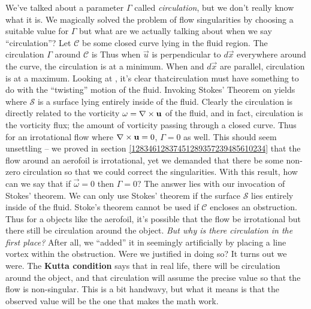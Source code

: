 \documentclass[12pt]{book}
\begin{document}
We've talked about a parameter $\Gamma$ called \textit{circulation}, but we don't really know what it is.  We magically solved the problem of flow singularities by choosing a suitable value for $\Gamma$ but what are we actually talking about when we say ``circulation''?  Let $\mathcal C$ be some closed curve lying in the fluid region.  The circulation $\Gamma$ around $\mathcal C$ is 
Thus when $\vec u$ is perpendicular to $d\vec x$ everywhere around the curve, the circulation is at a minimum.  When \vecu and $d\vec x$ are parallel, circulation is at a maximum.  Looking at , it's clear thatcirculation must have something to do with the ``twisting'' motion of the fluid.  Invoking Stokes' Theorem on  yields
where $\mathcal S$ is a surface lying entirely inside of the fluid.  Clearly the circulation is directly related to the vorticity $\vec\omega = \curl\vec u$ of the fluid, and in fact, circulation is the vorticity flux; the amount of vorticity passing through a closed curve.  Thus for an irrotational flow where $\curl\vec u=0$, $\Gamma=0$ as well.  This should seem unsettling -- we proved in section \ref{12834612837451289357239485610234} that the flow around an aerofoil is irrotational, yet we demanded that there be some non-zero circulation so that we could correct the singularities.  With this result, how can we say that if $\vec\omega = 0$ then $\Gamma = 0$?  The answer lies with our invocation of Stokes' theorem.  We can only use Stokes' theorem if the surface $\mathcal S$ lies entirely inside of the fluid.  Stoke's theorem cannot be used if $\mathcal C$ encloses an obstruction. Thus for a objects like the aerofoil, it's possible that the flow be irrotational but there still be circulation around the object.  \textit{But why is there circulation in the first place?}  After all, we ``added'' it in seemingly artificially by placing a line vortex within the obstruction.  Were we justified in doing so?  It turns out we were.  The \textbf{Kutta condition} says that in real life, there will be circulation around the object, and that circulation will assume the precise value so that the flow is non-singular. This is a bit handwavy, but what it means is that the observed value will be the one that makes the math work.
\end{document}
